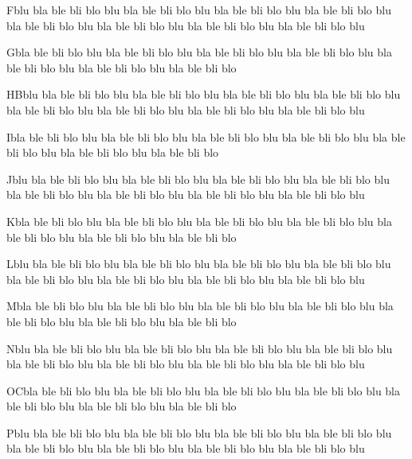 \documentclass[a4paper]{book}
\begin{document}
Fblu bla ble bli blo blu bla ble bli blo blu bla ble bli blo blu bla
ble bli blo blu bla ble bli blo blu bla ble bli blo blu bla ble bli
blo blu bla ble bli blo blu

Gbla ble bli blo blu bla ble bli blo blu bla ble bli blo blu bla ble
bli blo blu bla ble bli blo blu bla ble bli blo blu bla ble bli blo

HBblu bla ble bli blo blu bla ble bli blo blu bla ble bli blo blu bla
ble bli blo blu bla ble bli blo blu bla ble bli blo blu bla ble bli
blo blu bla ble bli blo blu

Ibla ble bli blo blu bla ble bli blo blu bla ble bli blo blu bla ble
bli blo blu bla ble bli blo blu bla ble bli blo blu bla ble bli blo

Jblu bla ble bli blo blu bla ble bli blo blu bla ble bli blo blu bla
ble bli blo blu bla ble bli blo blu bla ble bli blo blu bla ble bli
blo blu bla ble bli blo blu

Kbla ble bli blo blu bla ble bli blo blu bla ble bli blo blu bla ble
bli blo blu bla ble bli blo blu bla ble bli blo blu bla ble bli blo

Lblu bla ble bli blo blu bla ble bli blo blu bla ble bli blo blu bla
ble bli blo blu bla ble bli blo blu bla ble bli blo blu bla ble bli
blo blu bla ble bli blo blu

Mbla ble bli blo blu bla ble bli blo blu bla ble bli blo blu bla ble
bli blo blu bla ble bli blo blu bla ble bli blo blu bla ble bli blo

Nblu bla ble bli blo blu bla ble bli blo blu bla ble bli blo blu bla
ble bli blo blu bla ble bli blo blu bla ble bli blo blu bla ble bli
blo blu bla ble bli blo blu

OCbla ble bli blo blu bla ble bli blo blu bla ble bli blo blu bla ble
bli blo blu bla ble bli blo blu bla ble bli blo blu bla ble bli blo

Pblu bla ble bli blo blu bla ble bli blo blu bla ble bli blo blu bla
ble bli blo blu bla ble bli blo blu bla ble bli blo blu bla ble bli
blo blu bla ble bli blo blu
\end{document}
